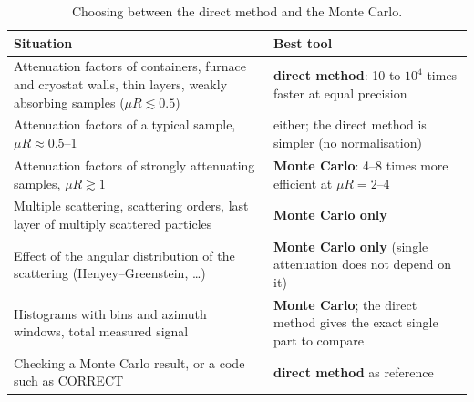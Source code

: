 \begin{table}[H]
  \centering\small
  \begin{tabular}{@{}>{\raggedright\arraybackslash}p{7.4cm}>{\raggedright\arraybackslash}p{7.2cm}@{}}
    \toprule \textbf{Situation} & \textbf{Best tool} \\ \midrule
    Attenuation factors of containers, furnace and cryostat walls, thin layers, weakly absorbing samples ($\mu R\lesssim0.5$) &
      \textbf{direct method}: 10 to $10^4$ times faster at equal precision \\
    Attenuation factors of a typical sample, $\mu R\approx0.5$--1 & either; the direct method is simpler (no normalisation) \\
    Attenuation factors of strongly attenuating samples, $\mu R\gtrsim1$ & \textbf{Monte Carlo}: 4--8 times more efficient at $\mu R=2$--4 \\
    Multiple scattering, scattering orders, last layer of multiply scattered particles & \textbf{Monte Carlo only} \\
    Effect of the angular distribution of the scattering (Henyey--Greenstein, \dots) & \textbf{Monte Carlo only} (single attenuation does not
      depend on it) \\
    Histograms with bins and azimuth windows, total measured signal & \textbf{Monte Carlo}; the direct method gives the exact single part to compare \\
    Checking a Monte Carlo result, or a code such as CORRECT & \textbf{direct method} as reference \\ \bottomrule
  \end{tabular}
  \caption{Choosing between the direct method and the Monte Carlo.}
  \label{tab:direct-choice}
\end{table}

